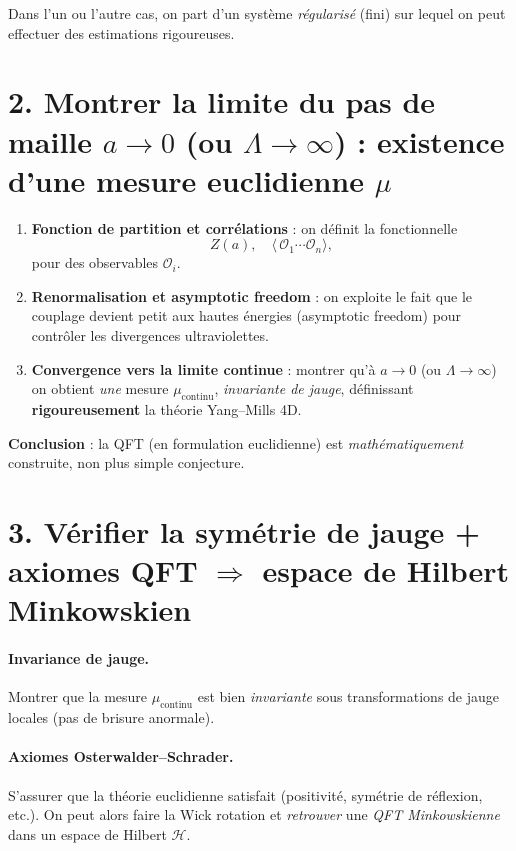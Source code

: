 \documentclass[11pt]{article}
\begin{document}
Dans l’un ou l’autre cas, on part d’un système \emph{régularisé} (fini) sur lequel on peut effectuer des estimations rigoureuses.

\section*{2. Montrer la limite du pas de maille \(a\to 0\) (ou \(\Lambda\to \infty\)) : existence d’une mesure euclidienne \(\mu\)}

\begin{enumerate}
  \item \textbf{Fonction de partition et corrélations} : on définit la fonctionnelle
  \[
    Z(a), \quad
    \langle\,\mathcal{O}_1\cdots\mathcal{O}_n\rangle,
  \]
  pour des observables \(\mathcal{O}_i\).
  \item \textbf{Renormalisation et asymptotic freedom} : on exploite le fait que le couplage devient petit aux hautes énergies (asymptotic freedom) pour contrôler les divergences ultraviolettes.
  \item \textbf{Convergence vers la limite continue} : montrer qu’à \(a\to 0\) (ou \(\Lambda\to\infty\)) on obtient \emph{une} mesure \(\mu_{\text{continu}}\), \emph{invariante de jauge}, définissant \textbf{rigoureusement} la théorie Yang--Mills 4D.
\end{enumerate}

\noindent
\textbf{Conclusion} : la QFT (en formulation euclidienne) est \emph{mathématiquement} construite, non plus simple conjecture.

\section*{3. Vérifier la symétrie de jauge + axiomes QFT \texorpdfstring{\(\Rightarrow\)}{} espace de Hilbert Minkowskien}

\paragraph{Invariance de jauge.}
Montrer que la mesure \(\mu_{\text{continu}}\) est bien \emph{invariante} sous transformations de jauge locales (pas de brisure anormale).

\paragraph{Axiomes Osterwalder--Schrader.}
S’assurer que la théorie euclidienne satisfait (positivité, symétrie de réflexion, etc.). On peut alors faire la Wick rotation et \emph{retrouver} une \emph{QFT Minkowskienne} dans un espace de Hilbert \(\mathcal{H}\).
\end{document}
